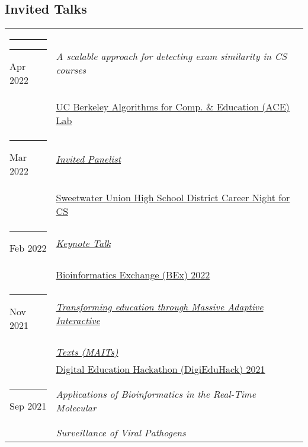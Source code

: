 \documentclass[margin,line]{res}
\begin{document}
\begin{resume}
\section{\sc Invited Talks}
\begin{longtable}{@{}p{0.7in}p{4in}}\rule{-1mm}{4.5mm}
\hspace*{-4mm} \rule{-1mm}{5mm} Apr 2022 & \textit{A scalable approach for detecting exam similarity in CS courses}\\*
\hspace*{-4mm} & \hspace{4mm} \href{https://acelab.berkeley.edu/}{UC Berkeley Algorithms for Comp. \& Education (ACE) Lab}\\
\hspace*{-4mm} \rule{-1mm}{5mm} Mar 2022 & \href{http://www.sweetwaterschools.org/}{\textit{Invited Panelist}}\\*
\hspace*{-4mm} & \hspace{4mm} \href{http://www.sweetwaterschools.org/}{Sweetwater Union High School District Career Night for CS}\\
\hspace*{-4mm} \rule{-1mm}{5mm} Feb 2022 & \href{https://bioinformatics.ucsd.edu/node/138}{\textit{Keynote Talk}}\\*
\hspace*{-4mm} & \hspace{4mm} \href{https://bioinformatics.ucsd.edu/node/138}{Bioinformatics Exchange (BEx) 2022}\\
\hspace*{-4mm} \rule{-1mm}{5mm} Nov 2021 & \href{https://www.youtube.com/watch?v=EPU_nv-yb_w&t=8206s}{\textit{Transforming education through Massive Adaptive Interactive}}\\*
\hspace*{-4mm} & \hspace{4mm} \href{https://www.youtube.com/watch?v=EPU_nv-yb_w&t=8206s}{\textit{Texts (MAITs)}}\\*
\hspace*{-4mm} & \hspace{4mm} \href{https://digieduhack.com/}{Digital Education Hackathon (DigiEduHack) 2021}\\
\hspace*{-4mm} \rule{-1mm}{5mm} Sep 2021 & \textit{Applications of Bioinformatics in the Real-Time Molecular}\\*
\hspace*{-4mm} & \hspace{4mm} \textit{Surveillance of Viral Pathogens}\\*

\end{longtable}
\end{resume}
\end{document}
